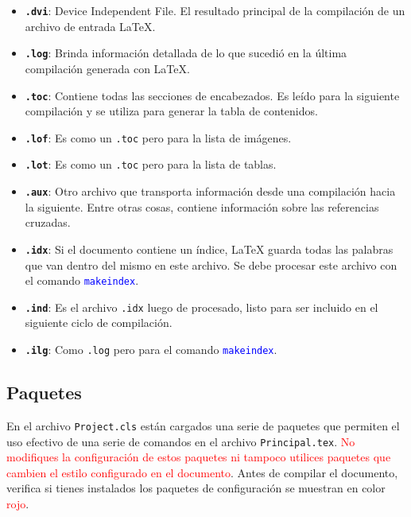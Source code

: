 \begin{itemize}
\item \texttt{\textbf{.dvi}}: Device Independent File. El resultado principal de la compilaci\'{o}n de un archivo de entrada \LaTeX{}.
\item \texttt{\textbf{.log}}: Brinda información detallada de lo que sucedi\'{o} en la \'{u}ltima compilación generada con \LaTeX{}.
\item \texttt{\textbf{.toc}}: Contiene todas las secciones de encabezados. Es leído para la siguiente compilación y se utiliza para generar la tabla de contenidos.
\item \texttt{\textbf{.lof}}: Es como un \texttt{.toc} pero para la lista de im\'{a}genes.
\item \texttt{\textbf{.lot}}: Es como un \texttt{.toc} pero para la lista de tablas.
\item \texttt{\textbf{.aux}}: Otro archivo que transporta informaci\'{o}n desde una compilación hacia la siguiente. Entre otras cosas, contiene información sobre las referencias cruzadas.
\item \texttt{\textbf{.idx}}: Si el documento contiene un índice, \LaTeX{} guarda todas las palabras que van dentro del mismo en este archivo. Se debe procesar este archivo con el comando \textcolor{blue}{\texttt{makeindex}}.
\item \texttt{\textbf{.ind}}: Es el archivo \texttt{.idx} luego de procesado, listo para ser incluido en el siguiente ciclo de compilación.
\item \texttt{\textbf{.ilg}}: Como \texttt{.log} pero para el comando \textcolor{blue}{\texttt{makeindex}}.
 \end{itemize}
                                                                                                          
\subsection{Paquetes}
\label{paquetes}
En el archivo \texttt{Project.cls} están cargados una serie de paquetes que permiten el uso efectivo de una serie de comandos en el archivo \texttt{Principal.tex}. \textcolor{red}{No modifiques la configuración de estos paquetes ni tampoco utilices paquetes que cambien el estilo configurado en el documento}. Antes de compilar el documento, verifica si tienes instalados los paquetes de configuración se muestran en color \textcolor{red}{rojo}.

